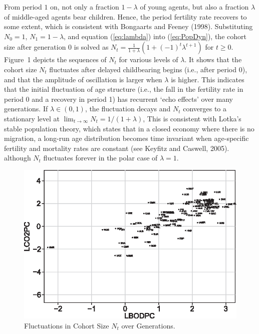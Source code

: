 \documentclass{MBE}%
\begin{document}
{From period $1$ on, not only a fraction $1-\lambda$ of young agents, but also a fraction $\lambda$
of middle-aged agents bear children. Hence, the period fertility rate recovers to some extent,
which is consistent with Bongaarts and Feeney (1998). Substituting $N_{0}=1$, $N_{1}=1-\lambda$,
and equation (\ref{eq:lambda}) into (\ref{eq:PopDyn}), the cohort size after generation 0 is
solved as $N_{t}=\frac{1}{1+\lambda}\left(  1+\left(  -1\right) ^{t}\lambda^{t+1}\right)  $ for
$t\geq0$. Figure~1 depicts the sequences of $N_{t}$ for various levels of $\lambda$. It shows that
the cohort size $N_{t}$ fluctuates after delayed childbearing begins (i.e., after period 0), and
that the amplitude of oscillation is larger when $\lambda$ is higher. This indicates that the
initial fluctuation of age structure (i.e., the fall in the fertility rate in period 0 and a
recovery in period 1) has recurrent `echo effects' over many generations. If $\lambda\in\left(
0,1\right)  $, the fluctuation decays and $N_{t}$ converges to a stationary level at
$\lim_{t\rightarrow\infty}N_{t}={1}/({1+\lambda})$, {This is consistent with Lotka's stable
population theory, which states that in a closed economy where there is no migration, a long-run
age distribution becomes time invariant when age-specific fertility and mortality rates are
constant (see Keyfitz and Caswell, 2005).} although $N_{t}$ fluctuates forever in the polar case
of $\lambda=1$.

\begin{figure}[t]
\begin{center}
\includegraphics[height=0.4\textheight]{flrf1.eps}
\end{center}
\caption{Fluctuations in Cohort Size $N_{t}$ over Generations.}%
\label{fig:kgrid}%
\end{figure}

}
\end{document}
